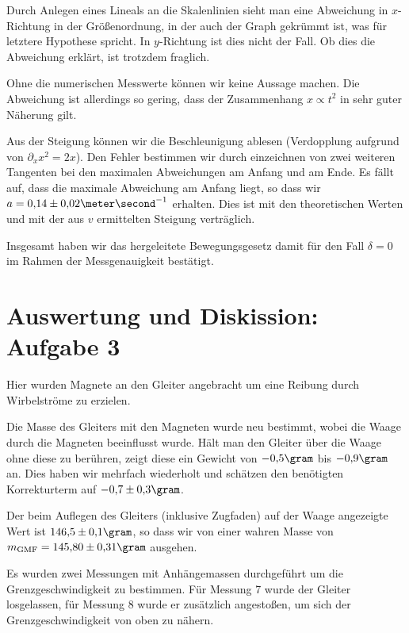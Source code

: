 \documentclass[a4paper,german,12pt,smallheadings]{scrartcl}
\begin{document}
Durch Anlegen eines Lineals an die Skalenlinien sieht man eine Abweichung in
$x$-Richtung in der Größenordnung, in der auch der Graph gekrümmt ist, was für
letztere Hypothese spricht. In $y$-Richtung ist dies nicht der Fall. Ob dies
die Abweichung erklärt, ist trotzdem fraglich.

Ohne die numerischen Messwerte können wir keine Aussage machen. Die Abweichung
ist allerdings so gering, dass der Zusammenhang $x \propto t^2$ in sehr guter
Näherung gilt.

Aus der Steigung können wir die Beschleunigung ablesen (Verdopplung aufgrund
von $\partial_x x^2 = 2x$). Den Fehler bestimmen wir durch einzeichnen von zwei
weiteren Tangenten bei den maximalen Abweichungen am Anfang und am Ende. Es
fällt auf, dass die maximale Abweichung am Anfang liegt, so dass wir $a =
0{,}14 \pm 0{,}02 \meter\second^{-1}$ erhalten. Dies ist mit den theoretischen
Werten und mit der aus $v$ ermittelten Steigung verträglich.

Insgesamt haben wir das hergeleitete Bewegungsgesetz damit für den Fall $\delta
= 0$ im Rahmen der Messgenauigkeit bestätigt.

\section*{Auswertung und Diskission: Aufgabe 3}


Hier wurden Magnete an den Gleiter angebracht um eine Reibung durch
Wirbelströme zu erzielen.

Die Masse des Gleiters mit den Magneten wurde neu bestimmt, wobei die Waage
durch die Magneten beeinflusst wurde. Hält man den Gleiter über die Waage ohne
diese zu berühren, zeigt diese ein Gewicht von $-0{,}5 \gram$ bis $-0{,}9
\gram$  an. Dies haben wir mehrfach wiederholt und schätzen den benötigten
Korrekturterm auf $-0{,}7 \pm 0{,}3 \gram$.

Der beim Auflegen des Gleiters (inklusive Zugfaden) auf der Waage angezeigte
Wert ist $146{,}5\pm0{,}1 \gram$, so dass wir von einer wahren Masse von
$m_\text{GMF} = 145{,}80\pm0{,}31 \gram$ ausgehen.


Es wurden zwei Messungen mit Anhängemassen durchgeführt um die
Grenzgeschwindigkeit zu bestimmen. Für Messung 7 wurde der Gleiter losgelassen,
für Messung 8 wurde er zusätzlich angestoßen, um sich der Grenzgeschwindigkeit
von oben zu nähern.
\end{document}
